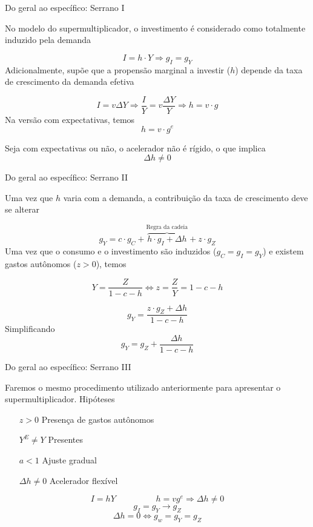 \documentclass[10pt]{beamer}
\begin{document}
\begin{frame}{Do geral ao específico: Serrano I}
	
No modelo do supermultiplicador, o investimento é considerado como totalmente induzido pela demanda

$$
I = h\cdot Y \Rightarrow g_I = g_Y
$$
Adicionalmente, supõe que a propensão marginal a investir ($h$) depende da taxa de crescimento da demanda efetiva

$$
I  = v\Delta Y \Rightarrow \frac{I}{Y} = v\frac{\Delta Y}{Y} \Rightarrow h = v\cdot g
$$
Na versão com expectativas, temos
$$
h = v\cdot g^e
$$

Seja com expectativas ou não, o acelerador não é rígido, o que implica
$$
\Delta h \neq 0
$$

\end{frame}

\begin{frame}{Do geral ao específico: Serrano II}
	
Uma vez que $h$ varia com a demanda, a contribuição da taxa de crescimento deve se alterar

$$
g_Y = c\cdot g_C + \overbrace{h\cdot g_I + \Delta h}^{\text{Regra da cadeia}} + z\cdot g_Z
$$
Uma vez que o consumo e o investimento são induzidos ($g_C = g_I = g_Y$) e existem gastos autônomos ($z>0$), temos

$$
Y = \frac{Z}{1-c-h} \Leftrightarrow z = \frac{Z}{Y} = 1-c-h
$$

$$
g_Y = \frac{z\cdot g_Z + \Delta h}{1 - c - h}
$$
Simplificando
$$
g_Y = g_Z + \frac{\Delta h}{1-c-h}
$$

	
\end{frame}

\begin{frame}{Do geral ao específico: Serrano III}
	
Faremos o mesmo procedimento utilizado anteriormente para apresentar o supermultiplicador. Hipóteses

\begin{itemize}
	\item[$z>0$] Presença de gastos autônomos
	\item[$Y^E\neq Y$] Presentes
	\item[$a<1$] Ajuste gradual
	\item[$\Delta h \neq 0$] Acelerador flexível
\end{itemize}

$$
I = hY \hspace{2cm} h = vg^e \Rightarrow \Delta h \neq 0
$$	
$$
g_I = g_Y \to g_Z
$$
$$
\Delta h = 0 \Leftrightarrow g_w = g_Y = g_Z
$$

\end{frame}
\end{document}
